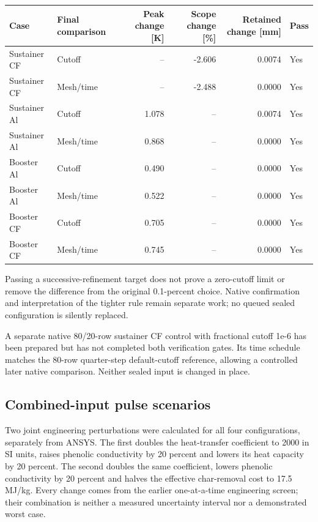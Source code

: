 \documentclass[oneside,openany]{amsdtx}
\begin{document}
\begin{table}[H]\centering\scriptsize\begin{tabular}{llrrrl}\toprule Case & Final comparison & Peak change [K] & Scope change [\%] & Retained change [mm] & Pass\\\midrule

Sustainer CF & Cutoff & -- & -2.606 & 0.0074 & Yes \\

Sustainer CF & Mesh/time & -- & -2.488 & 0.0000 & Yes \\

Sustainer Al & Cutoff & 1.078 & -- & 0.0074 & Yes \\

Sustainer Al & Mesh/time & 0.868 & -- & 0.0000 & Yes \\

Booster Al & Cutoff & 0.490 & -- & 0.0000 & Yes \\

Booster Al & Mesh/time & 0.522 & -- & 0.0000 & Yes \\

Booster CF & Cutoff & 0.705 & -- & 0.0000 & Yes \\

Booster CF & Mesh/time & 0.745 & -- & 0.0000 & Yes \\

\bottomrule\end{tabular}\end{table}

Passing a successive-refinement target does not prove a zero-cutoff limit or remove the difference from the original 0.1-percent choice. Native confirmation and interpretation of the tighter rule remain separate work; no queued sealed configuration is silently replaced.

A separate native 80/20-row sustainer CF control with fractional cutoff 1e-6 has been prepared but has not completed both verification gates. Its time schedule matches the 80-row quarter-step default-cutoff reference, allowing a controlled later native comparison. Neither sealed input is changed in place.

\subsection{Combined-input pulse scenarios}

Two joint engineering perturbations were calculated for all four configurations, separately from ANSYS. The first doubles the heat-transfer coefficient to 2000 in SI units, raises phenolic conductivity by 20 percent and lowers its heat capacity by 20 percent. The second doubles the same coefficient, lowers phenolic conductivity by 20 percent and halves the effective char-removal cost to 17.5 MJ/kg. Every change comes from the earlier one-at-a-time engineering screen; their combination is neither a measured uncertainty interval nor a demonstrated worst case.
\end{document}
